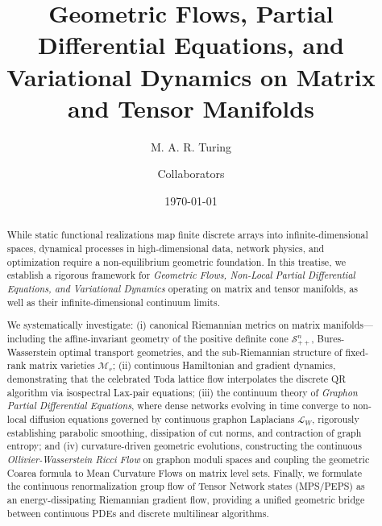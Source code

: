 \documentclass[11pt,a4paper,reqno]{amsart}
\title[Geometric Flows on Matrix and Tensor Manifolds]{Geometric Flows, Partial Differential Equations, and Variational Dynamics on Matrix and Tensor Manifolds}
\author{M. A. R. Turing \and Collaborators}
\date{\today}
\theoremstyle{definition}
\numberwithin{equation}{section}
\begin{document}
\begin{abstract}
While static functional realizations map finite discrete arrays into infinite-dimensional spaces, dynamical processes in high-dimensional data, network physics, and optimization require a non-equilibrium geometric foundation. In this treatise, we establish a rigorous framework for \emph{Geometric Flows, Non-Local Partial Differential Equations, and Variational Dynamics} operating on matrix and tensor manifolds, as well as their infinite-dimensional continuum limits. 

We systematically investigate: (i) canonical Riemannian metrics on matrix manifolds---including the affine-invariant geometry of the positive definite cone $\mathcal{S}_{++}^n$, Bures-Wasserstein optimal transport geometries, and the sub-Riemannian structure of fixed-rank matrix varieties $\mathcal{M}_r$; (ii) continuous Hamiltonian and gradient dynamics, demonstrating that the celebrated Toda lattice flow interpolates the discrete QR algorithm via isospectral Lax-pair equations; (iii) the continuum theory of \emph{Graphon Partial Differential Equations}, where dense networks evolving in time converge to non-local diffusion equations governed by continuous graphon Laplacians $\mathcal{L}_W$, rigorously establishing parabolic smoothing, dissipation of cut norms, and contraction of graph entropy; and (iv) curvature-driven geometric evolutions, constructing the continuous \emph{Ollivier-Wasserstein Ricci Flow} on graphon moduli spaces and coupling the geometric Coarea formula to Mean Curvature Flows on matrix level sets. Finally, we formulate the continuous renormalization group flow of Tensor Network states (MPS/PEPS) as an energy-dissipating Riemannian gradient flow, providing a unified geometric bridge between continuous PDEs and discrete multilinear algorithms.
\end{abstract}


\maketitle

\tableofcontents

\newpage

\end{document}
